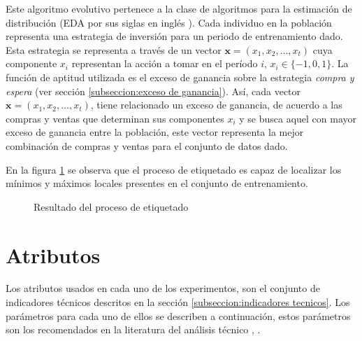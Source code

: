 \documentclass[12pt]{report}
\theoremstyle{break}
\theoremstyle{break}
\begin{document}
Este algoritmo evolutivo pertenece a la clase de algoritmos para la estimación de distribución (EDA por sus siglas en inglés \cite{simon2013evolutionary}). Cada individuo en la población representa una estrategia de inversión para un periodo de entrenamiento dado. Esta estrategia se representa a través de un vector $\mathbf{x} = (x_1, x_2, \ldots, x_t)$ cuya componente $x_i$ representan la acción a tomar en el período $i$, $x_i \in \{-1,0,1\}.$ La función de aptitud utilizada es el exceso de ganancia sobre la estrategia \textit{compra y espera} (ver sección \ref{subseccion:exceso de ganancia}). Así, cada vector $\mathbf{x} = (x_1, x_2, \ldots, x_t)$, tiene relacionado un exceso de ganancia, de acuerdo a las compras y ventas que determinan sus componentes $x_i$ y se busca aquel con mayor exceso de ganancia entre la población, este vector representa la mejor combinación de compras y ventas para el conjunto de datos dado.

En la figura \ref{imagen:etiquetado} se observa que el proceso de etiquetado es capaz de localizar los mínimos y máximos locales presentes en el conjunto de entrenamiento.

\begin{figure}[ht]
\centering
{}
\caption{\label{imagen:etiquetado} Resultado del proceso de etiquetado}
\end{figure}



\section{Atributos}
\label{seccion:atributos}
Los atributos usados en cada uno de los experimentos, son el conjunto de indicadores técnicos descritos en la sección \ref{subseccion:indicadores tecnicos}. Los parámetros para cada uno de ellos se describen a continuación, estos parámetros son los recomendados en la literatura del análisis técnico \cite{encycoplediaTechnicalIndicators}, \cite{technicalAnalysisKirkPatrick}.
\end{document}
